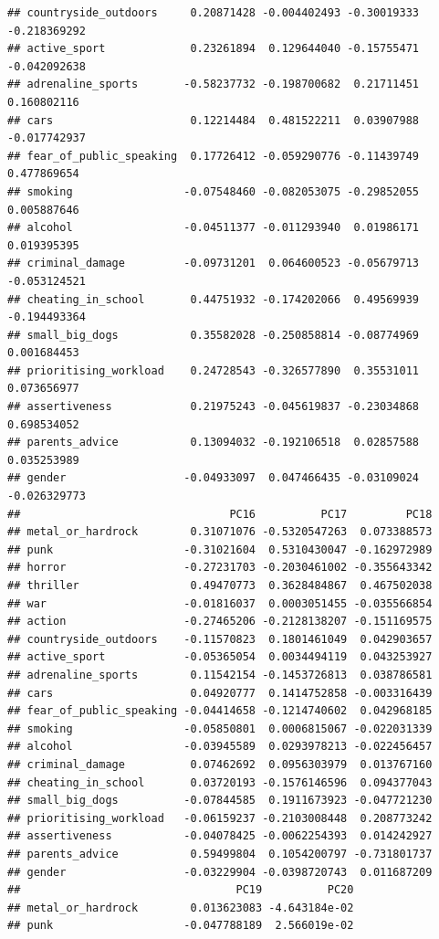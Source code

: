 \documentclass[]{article}
\begin{document}
\begin{verbatim}
## countryside_outdoors     0.20871428 -0.004402493 -0.30019333 -0.218369292
## active_sport             0.23261894  0.129644040 -0.15755471 -0.042092638
## adrenaline_sports       -0.58237732 -0.198700682  0.21711451  0.160802116
## cars                     0.12214484  0.481522211  0.03907988 -0.017742937
## fear_of_public_speaking  0.17726412 -0.059290776 -0.11439749  0.477869654
## smoking                 -0.07548460 -0.082053075 -0.29852055  0.005887646
## alcohol                 -0.04511377 -0.011293940  0.01986171  0.019395395
## criminal_damage         -0.09731201  0.064600523 -0.05679713 -0.053124521
## cheating_in_school       0.44751932 -0.174202066  0.49569939 -0.194493364
## small_big_dogs           0.35582028 -0.250858814 -0.08774969  0.001684453
## prioritising_workload    0.24728543 -0.326577890  0.35531011  0.073656977
## assertiveness            0.21975243 -0.045619837 -0.23034868  0.698534052
## parents_advice           0.13094032 -0.192106518  0.02857588  0.035253989
## gender                  -0.04933097  0.047466435 -0.03109024 -0.026329773
##                                PC16          PC17         PC18
## metal_or_hardrock        0.31071076 -0.5320547263  0.073388573
## punk                    -0.31021604  0.5310430047 -0.162972989
## horror                  -0.27231703 -0.2030461002 -0.355643342
## thriller                 0.49470773  0.3628484867  0.467502038
## war                     -0.01816037  0.0003051455 -0.035566854
## action                  -0.27465206 -0.2128138207 -0.151169575
## countryside_outdoors    -0.11570823  0.1801461049  0.042903657
## active_sport            -0.05365054  0.0034494119  0.043253927
## adrenaline_sports        0.11542154 -0.1453726813  0.038786581
## cars                     0.04920777  0.1414752858 -0.003316439
## fear_of_public_speaking -0.04414658 -0.1214740602  0.042968185
## smoking                 -0.05850801  0.0006815067 -0.022031339
## alcohol                 -0.03945589  0.0293978213 -0.022456457
## criminal_damage          0.07462692  0.0956303979  0.013767160
## cheating_in_school       0.03720193 -0.1576146596  0.094377043
## small_big_dogs          -0.07844585  0.1911673923 -0.047721230
## prioritising_workload   -0.06159237 -0.2103008448  0.208773242
## assertiveness           -0.04078425 -0.0062254393  0.014242927
## parents_advice           0.59499804  0.1054200797 -0.731801737
## gender                  -0.03229904 -0.0398720743  0.011687209
##                                 PC19          PC20
## metal_or_hardrock        0.013623083 -4.643184e-02
## punk                    -0.047788189  2.566019e-02

\end{verbatim}
\end{document}
